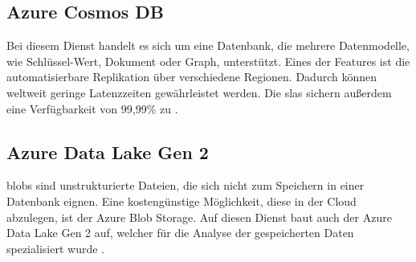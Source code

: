 \subsection{Azure Cosmos DB} \label{sec:grundlagen:azure_dienste:cosmosDB}
Bei diesem Dienst handelt es sich um eine Datenbank, die mehrere Datenmodelle, wie Schlüssel-Wert, Dokument oder Graph, unterstützt. Eines der Features ist die automatisierbare Replikation über verschiedene Regionen. Dadurch können weltweit geringe Latenzzeiten gewährleistet werden. Die \acp{sla} sichern außerdem eine Verfügbarkeit von 99,99\% zu \cite{guay_paz_introduction_2018}. 

\subsection{Azure Data Lake Gen 2} \label{sec:grundlagen:azure_dienste:dataLake}
\acp{blob} sind unstrukturierte Dateien, die sich nicht zum Speichern in einer Datenbank eignen. Eine kostengünstige Möglichkeit, diese in der Cloud abzulegen, ist der Azure Blob Storage. Auf diesen Dienst baut auch der Azure Data Lake Gen 2 auf, welcher für die Analyse der gespeicherten Daten spezialisiert wurde \cite{soh_azure_2020}. 